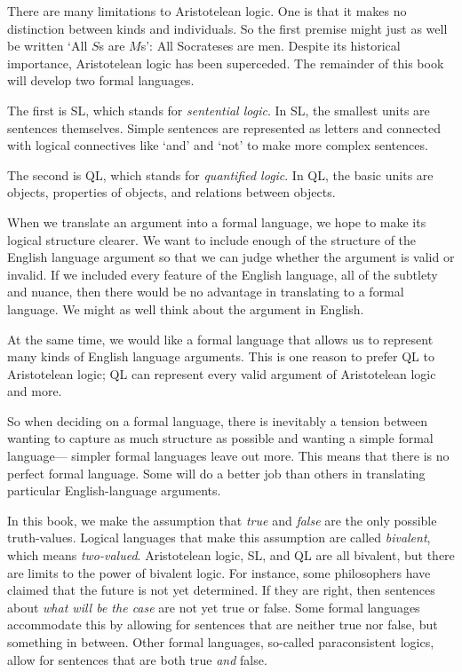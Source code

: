 There are many limitations to Aristotelean logic. One is that it makes no distinction between kinds and individuals. So the first premise might just as well be written `All $S$s are $M$s': All Socrateses are men. Despite its historical importance, Aristotelean logic has been superceded. The remainder of this book will develop two formal languages.

The first is SL, which stands for \emph{sentential logic}. In SL, the smallest units are sentences themselves. Simple sentences are represented as letters and connected with {logical connectives} like `and' and `not' to make more complex sentences.

The second is QL, which stands for \emph{quantified logic}. In QL, the basic units are objects, properties of objects, and relations between objects.




When we translate an argument into a formal language, we hope to make its logical structure clearer. We want to include enough of the structure of the English language argument so that we can judge whether the argument is valid or invalid. If we included every feature of the English language, all of the subtlety and nuance, then there would be no advantage in translating to a formal language. We might as well think about the argument in English.

At the same time, we would like a formal language that allows us to represent many kinds of English language arguments. This is one reason to prefer QL to Aristotelean logic; QL can represent every valid argument of Aristotelean logic and more.

So when deciding on a formal language, there is inevitably a tension between wanting to capture as much structure as possible and wanting a simple formal language--- simpler formal languages leave out more. This means that there is no perfect formal language. Some will do a better job than others in translating particular English-language arguments.

In this book, we make the assumption that \emph{true} and \emph{false} are the only possible truth-values. Logical languages that make this assumption are called \emph{bivalent}, which means \emph{two-valued}. Aristotelean logic, SL, and QL are all bivalent, but there are limits to the power of bivalent logic. For instance, some philosophers have claimed that the future is not yet determined. If they are right, then sentences about \emph{what will be the case} are not yet true or false.
Some formal languages accommodate this by allowing for sentences that are neither true nor false, but something in between.
Other formal languages, so-called paraconsistent logics, allow for sentences that are both true \emph{and} false.

